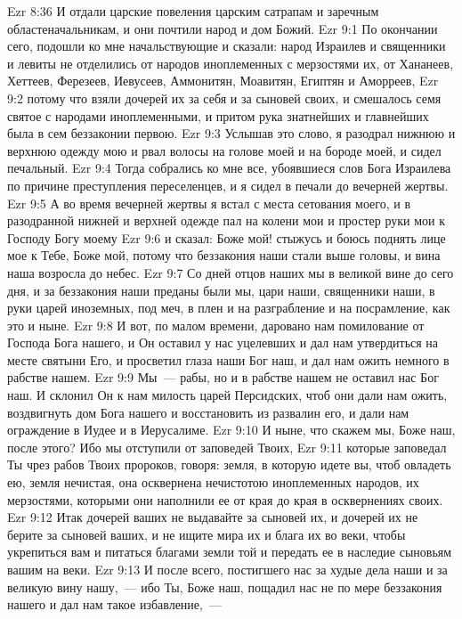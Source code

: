 \vs Ezr 8:36 И отдали царские повеления царским сатрапам и заречным областеначальникам, и они почтили народ и дом Божий.
\vs Ezr 9:1 По окончании сего, подошли ко мне начальствующие и сказали: народ Израилев и священники и левиты не отделились от народов иноплеменных с мерзостями их, от Хананеев, Хеттеев, Ферезеев, Иевусеев, Аммонитян, Моавитян, Египтян и Аморреев,
\vs Ezr 9:2 потому что взяли дочерей их за себя и за сыновей своих, и смешалось семя святое с народами иноплеменными, и притом рука знатнейших и главнейших была в сем беззаконии первою.
\rsbpar\vs Ezr 9:3 Услышав это слово, я разодрал нижнюю и верхнюю одежду мою и рвал волосы на голове моей и на бороде моей, и сидел печальный.
\vs Ezr 9:4 Тогда собрались ко мне все, убоявшиеся слов Бога Израилева по причине преступления переселенцев, и я сидел в печали до вечерней жертвы.
\vs Ezr 9:5 А во время вечерней жертвы я встал с места сетования моего, и в разодранной нижней и верхней одежде пал на колени мои и простер руки мои к Господу Богу моему
\vs Ezr 9:6 и сказал: Боже мой! стыжусь и боюсь поднять лице мое к Тебе, Боже мой, потому что беззакония наши стали выше головы, и вина наша возросла до небес.
\vs Ezr 9:7 Со дней отцов наших мы в великой вине до сего дня, и за беззакония наши преданы были мы, цари наши, священники наши, в руки царей иноземных, под меч, в плен и на разграбление и на посрамление, как это и ныне.
\vs Ezr 9:8 И вот, по малом времени, даровано нам помилование от Господа Бога нашего, и Он оставил у нас  уцелевших и дал нам утвердиться на месте святыни Его, и просветил глаза наши Бог наш, и дал нам ожить немного в рабстве нашем.
\vs Ezr 9:9 Мы~--- рабы, но и в рабстве нашем не оставил нас Бог наш. И склонил Он к нам милость царей Персидских, чтоб они дали нам ожить, воздвигнуть дом Бога нашего и восстановить  из развалин его, и дали нам ограждение в Иудее и в Иерусалиме.
\vs Ezr 9:10 И ныне, что скажем мы, Боже наш, после этого? Ибо мы отступили от заповедей Твоих,
\vs Ezr 9:11 которые заповедал Ты чрез рабов Твоих пророков, говоря: земля, в которую идете вы, чтоб овладеть ею, земля нечистая, она осквернена нечистотою иноплеменных народов, их мерзостями, которыми они наполнили ее от края до края в осквернениях своих.
\vs Ezr 9:12 Итак дочерей ваших не выдавайте за сыновей их, и дочерей их не берите за сыновей ваших, и не ищите мира их и блага их во веки, чтобы укрепиться вам и питаться благами земли той и передать ее в наследие сыновьям вашим на веки.
\vs Ezr 9:13 И после всего, постигшего нас за худые дела наши и за великую вину нашу,~--- ибо Ты, Боже наш, пощадил нас не по мере беззакония нашего и дал нам такое избавление,~---
